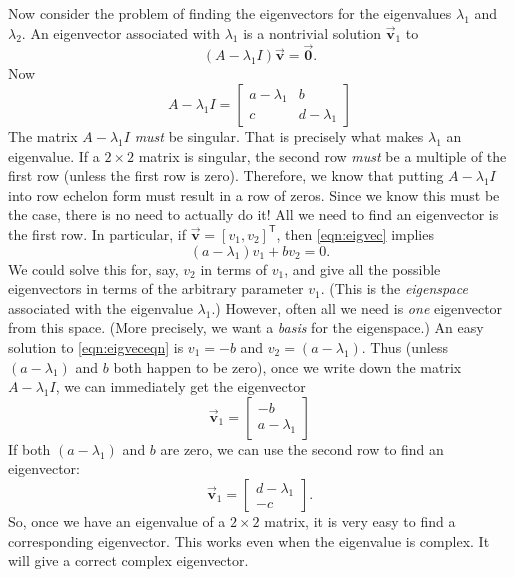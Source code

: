 \documentclass[reqno]{immbook}
\newcommand{\BV}{\vec{\textbf{v}}}
\newcommand{\BZero}{\vec{\textbf{0}}}  %
\numberwithin{equation}{chapter}
\numberwithin{question}{section}
\numberwithin{theorem}{chapter}
\numberwithin{figure}{chapter}
\theoremstyle{definition}
\begin{document}
Now consider the problem of finding the eigenvectors
for the eigenvalues $\lambda_1$ and $\lambda_2$.
An eigenvector associated with $\lambda_1$ is a nontrivial
solution $\BV_1$ to
\begin{equation}
    (A-\lambda_1 I)\BV = \BZero.
\label{eqn:eigvec}
\end{equation}
Now
\[
   A - \lambda_1 I = \begin{bmatrix}
                           a-\lambda_1 & b \\
			   c & d-\lambda_1
                     \end{bmatrix}
\]
The matrix $A-\lambda_1 I$ \emph{must} be singular.
That is precisely what makes $\lambda_1$ an eigenvalue.
If a $2\times 2$ matrix is singular, the second
row \emph{must} be a multiple of the first row (unless
the first row is zero).  Therefore, we know that putting
$A-\lambda_1 I$ into row echelon form must result in
a row of zeros.  Since we know this must be the case,
there is no need to actually do it!  All we need to
find an eigenvector is the first row.
In particular, if $\BV = [v_1,v_2]^{\textsf{T}}$,
then \eqref{eqn:eigvec} implies
\begin{equation}
  (a-\lambda_1)v_1 + b v_2 = 0.
\label{eqn:eigveceqn}
\end{equation}
We could solve this for, say, $v_2$ in terms of $v_1$,
and give all the possible eigenvectors in terms of
the arbitrary parameter $v_1$. (This is the
\emph{eigenspace} associated with the eigenvalue $\lambda_1$.)
However,
often
all we need is \emph{one} eigenvector from this space.
(More precisely, we want a \emph{basis} for the eigenspace.)
An easy solution to \eqref{eqn:eigveceqn}
is $v_1=-b$ and $v_2 = (a-\lambda_1)$.
Thus (unless $(a-\lambda_1)$ and $b$ both happen to be
zero), once we write down the matrix $A-\lambda_1 I$,
we can immediately get the eigenvector
\[
   \BV_1 = \begin{bmatrix} -b \\ a-\lambda_1 \end{bmatrix}
\]
If both $(a-\lambda_1)$ and $b$ are zero, we can use the
second row to find an eigenvector:
\[
   \BV_1 = \begin{bmatrix} d-\lambda_1 \\ -c \end{bmatrix}.
\]
So, once we have an eigenvalue
of a $2\times 2$ matrix, it is very easy to find
a corresponding eigenvector.
This works even when the eigenvalue is complex.
It will give a correct complex eigenvector.
\end{document}
